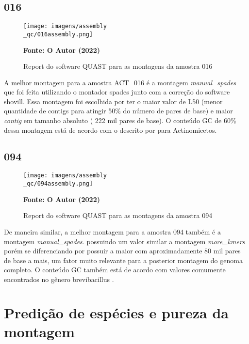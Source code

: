 \subsection{016}
\begin{figure}[H]
	\caption{Report do software QUAST para as montagens da amostra 016}
	\label{fig:quast_16}
	\centering
		\texttt{[image: imagens/assembly\\\_qc/016assembly.png]}
    \begin{small}\textbf{Fonte: O Autor (2022)}\end{small}
\end{figure}
\vspace{\floatsep}

A melhor montagem para a amostra ACT\_016 é a montagem \textit{manual_spades} que foi feita utilizando
o montador spades junto com a correção do software shovill. Essa montagem foi escolhida por ter o maior
valor de L50 (menor quantidade de contigs para atingir 50\% do número de pares de base) e maior 
\textit{contig} em tamanho absoluto ( 222 mil pares de base). O conteúdo GC de 60\% dessa montagem está de acordo
com o descrito por  para Actinomicetos.

\subsection{094}

\begin{figure}[H]
	\caption{Report do software QUAST para as montagens da amostra 094}
	\label{fig:quast_16}
	\centering
		\texttt{[image: imagens/assembly\\\_qc/094assembly.png]}
    \begin{small}\textbf{Fonte: O Autor (2022)}\end{small}
\end{figure}
\vspace{\floatsep}

De maneira similar, a melhor montagem para a amostra 094 também é a montagem \textit{manual_spades}.
possuindo um valor similar a montagem \textit{more_kmers} porém se diferenciando por possuir a maior 
com aproximadamente 80 mil pares de base a mais, um fator muito relevante para a posterior montagem do genoma completo.
O conteúdo GC também está de acordo com valores comumente encontrados no gênero brevibacillus \cite{TODO}.

\section{Predição de espécies e pureza da montagem}